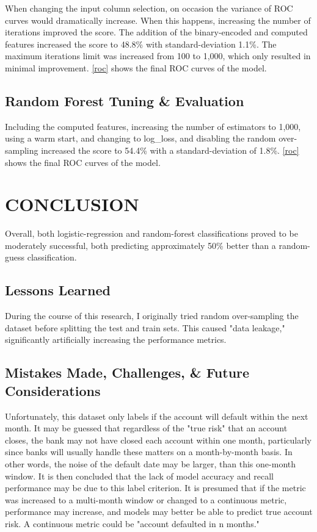 \documentclass[conference]{IEEEtran}
\begin{document}
When changing the input column selection, on occasion the variance of ROC
curves would dramatically increase. When this happens, increasing the number of
iterations improved the score. The addition of the binary-encoded and computed
features increased the score to 48.8\% with standard-deviation 1.1\%. The
maximum iterations limit was increased from 100 to 1,000, which only resulted
in minimal improvement. \autoref{roc} shows the final ROC curves of the model.

\subsection{Random Forest Tuning \& Evaluation}

Including the computed features, increasing the number of estimators to 1,000,
using a warm start, and changing to log\_loss, and disabling the random
over-sampling increased the score to 54.4\% with a standard-deviation of 1.8\%.
\autoref{roc} shows the final ROC curves of the model.

\FloatBarrier
\section{CONCLUSION}

Overall, both logistic-regression and random-forest classifications proved to
be moderately successful, both predicting approximately 50\% better than a
random-guess classification.

\subsection{Lessons Learned}

During the course of this research, I originally tried random over-sampling the
dataset before splitting the test and train sets. This caused "data leakage,"
significantly artificially increasing the performance metrics.

\subsection{Mistakes Made, Challenges, \& Future Considerations}

Unfortunately, this dataset only labels if the account will default within the
next month. It may be guessed that regardless of the "true risk" that an
account closes, the bank may not have closed each account within one month,
particularly since banks will usually handle these matters on a month-by-month
basis. In other words, the noise of the default date may be larger, than this
one-month window. It is then concluded that the lack of model accuracy and
recall performance may be due to this label criterion. It is presumed that if
the metric was increased to a multi-month window or changed to a continuous
metric, performance may increase, and models may better be able to predict true
account risk. A continuous metric could be "account defaulted in n months."
\end{document}

